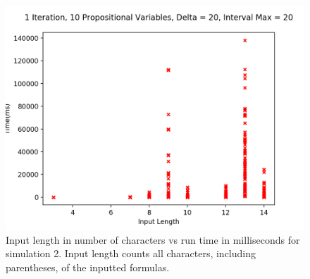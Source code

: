 \documentclass[runningheads]{llncs}
\begin{document}
\begin{figure}[H]
    \centering
    \includegraphics[scale=0.75]{images/Sim2Time.png}
    \caption{Input length in number of characters vs run time in milliseconds for simulation 2. Input length counts all characters, including parentheses, of the inputted formulas.}
\end{figure}
\end{document}
